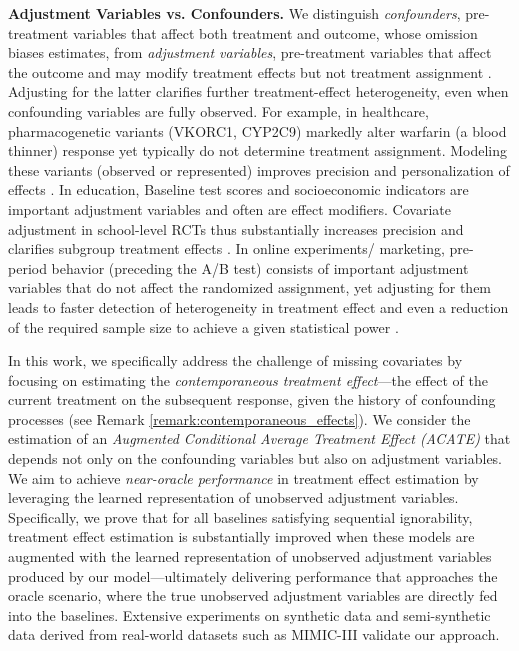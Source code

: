 \documentclass[10pt]{article} %
\begin{document}
\textbf{Adjustment Variables vs. Confounders.} We distinguish \textit{confounders}, pre-treatment variables that affect both treatment and outcome, whose omission biases estimates, from \textit{adjustment variables}, pre-treatment variables that affect the outcome and may modify treatment effects but not treatment assignment \citep{causainf_whatIf}. Adjusting for the latter clarifies further treatment-effect heterogeneity, even when confounding variables are fully observed. For example, in healthcare, pharmacogenetic variants (VKORC1, CYP2C9) markedly alter warfarin (a blood thinner) response yet typically do not determine treatment assignment. Modeling these variants (observed or represented) improves precision and personalization of effects \citep{mcclain2008warfarin, Ute2008Warfarin}. In education, Baseline test scores and socioeconomic indicators are important adjustment variables and often are effect modifiers. Covariate adjustment in school-level RCTs thus substantially increases precision and clarifies subgroup treatment effects \citep{HowardBaselinesCovRCTs2007, steingrimsson2017improving}. In online experiments/ marketing, pre-period behavior (preceding the A/B test) consists of important adjustment variables that do not affect the randomized assignment, yet adjusting for them leads to faster detection of heterogeneity in treatment effect and even a reduction of the required sample size to achieve a given statistical power \citep{deng2013improving,benkeser2021improving}.


In this work, we specifically address the challenge of missing covariates by focusing on estimating the \emph{contemporaneous treatment effect}—the effect of the current treatment on the subsequent response, given the history of confounding processes (see Remark \ref{remark:contemporaneous_effects}). We consider the estimation of an \emph{Augmented Conditional Average Treatment Effect (ACATE)} that depends not only on the confounding variables but also on adjustment variables. We aim to achieve \emph{near-oracle performance} in treatment effect estimation by leveraging the learned representation of unobserved adjustment variables. Specifically, we prove that for all baselines satisfying sequential ignorability, treatment effect estimation is substantially improved when these models are augmented with the learned representation of unobserved adjustment variables produced by our model—ultimately delivering performance that approaches the oracle scenario, where the true unobserved adjustment variables are directly fed into the baselines. Extensive experiments on synthetic data and semi-synthetic data derived from real-world datasets such as MIMIC-III \citep{johnson2016mimic} validate our approach.
\end{document}

